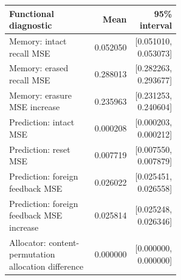 \begin{tabular}{p{0.56\linewidth}rr}
\toprule
Functional diagnostic & Mean & 95\% interval \\
\midrule
Memory: intact recall MSE & 0.052050 & [0.051010, 0.053073] \\
Memory: erased recall MSE & 0.288013 & [0.282263, 0.293677] \\
Memory: erasure MSE increase & 0.235963 & [0.231253, 0.240604] \\
Prediction: intact MSE & 0.000208 & [0.000203, 0.000212] \\
Prediction: reset MSE & 0.007719 & [0.007550, 0.007879] \\
Prediction: foreign feedback MSE & 0.026022 & [0.025451, 0.026558] \\
Prediction: foreign feedback MSE increase & 0.025814 & [0.025248, 0.026346] \\
Allocator: content-permutation allocation difference & 0.000000 & [0.000000, 0.000000] \\
\bottomrule
\end{tabular}

